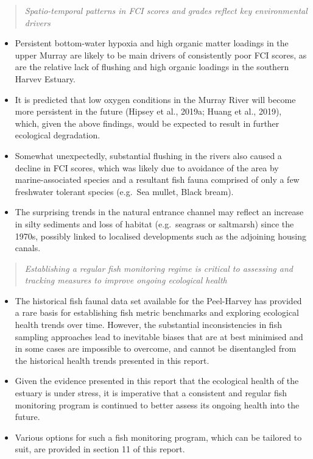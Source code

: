 \documentclass[
]{book}
\begin{document}
\begin{quote}
\emph{Spatio-temporal patterns in FCI scores and grades reflect key environmental drivers}
\end{quote}

\begin{itemize}
\item
  Persistent bottom-water hypoxia and high organic matter loadings in the upper Murray are likely to be main drivers of consistently poor FCI scores, as are the relative lack of flushing and high organic loadings in the southern Harvev Estuary.~
\item
  It is predicted that low oxygen conditions in the Murray River will become more persistent in the future (Hipsey et al., 2019a; Huang et al., 2019), which, given the above findings, would be expected to result in further ecological degradation.~
\item
  Somewhat unexpectedly, substantial flushing in the rivers also caused a decline in FCI scores, which was likely due to avoidance of the area by marine-associated species and a resultant fish fauna comprised of only a few freshwater tolerant species (e.g.~Sea mullet, Black bream).~
\item
  The surprising trends in the natural entrance channel may reflect an increase in silty sediments and loss of habitat (e.g.~seagrass or saltmarsh) since the 1970s, possibly linked to localised developments such as the adjoining housing canals.
\end{itemize}

\begin{quote}
\emph{Establishing a regular fish monitoring regime is critical to assessing and tracking measures to improve ongoing ecological health}
\end{quote}

\begin{itemize}
\item
  The historical fish faunal data set available for the Peel-Harvey has provided a rare basis for establishing fish metric benchmarks and exploring ecological health trends over time. However, the substantial inconsistencies in fish sampling approaches lead to inevitable biases that are at best minimised and in some cases are impossible to overcome, and cannot be disentangled from the historical health trends presented in this report.
\item
  Given the evidence presented in this report that the ecological health of the estuary is under stress, it is imperative that a consistent and regular fish monitoring program is continued to better assess its ongoing health into the future.~
\item
  Various options for such a fish monitoring program, which can be tailored to suit, are provided in section 11 of this report.
\end{itemize}
\end{document}
